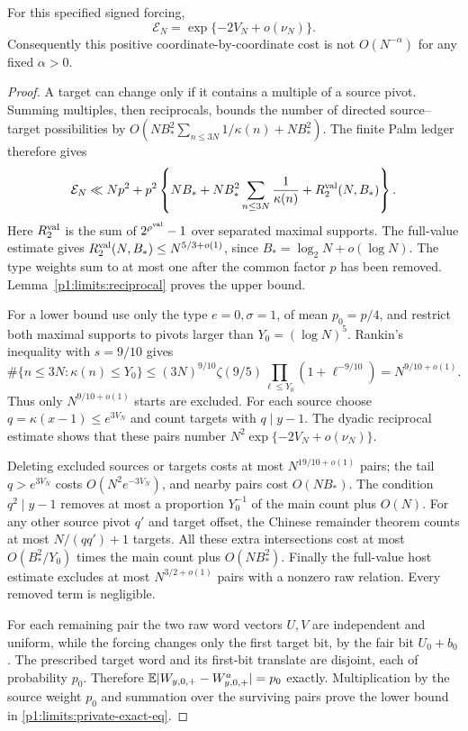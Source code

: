 \begin{proposition}
\label{p1:limits:private-exact}
For this specified signed forcing,
\begin{equation}
 \mathcal E_N=\exp\{-2V_N+o(\nu_N)\}.
 \label{p1:limits:private-exact-eq}
\end{equation}
Consequently this positive coordinate-by-coordinate cost is
not $O(N^{-\alpha})$ for any fixed $\alpha>0$.
\end{proposition}
\begin{proof}
A target can change only if it contains a multiple of a
source pivot.  Summing multiples, then reciprocals, bounds
the number of directed source--target possibilities by
$O(NB_*^2\sum_{n\le3N}1/\kappa(n)+NB_*^2)$.
The finite Palm ledger
\cite[Lemma~F.2 and equation~(F.6)]{pouly2026c} therefore gives
\[
 \mathcal E_N\ll Np^2+
 p^2\left\{NB_*+
       NB_*^2\sum_{n\le3N}\frac1{\kappa(n)}
       +R^{\rm val}_2(N,B_*)\right\}.
\]
Here $R^{\rm val}_2$ is the sum of $2^{\rho^{\rm val}}-1$
over separated maximal supports.  The full-value estimate
\cite[Proposition~3.24]{pouly2026c} gives
$R^{\rm val}_2(N,B_*)\le N^{5/3+o(1)}$, since
$B_*=\log_2N+o(\log N)$.  The type weights sum to at most
one after the common factor $p$ has been removed.
Lemma~\ref{p1:limits:reciprocal} proves the upper bound.

For a lower bound use only the type $e=0,\sigma=1$, of
mean $p_0=p/4$, and restrict both maximal supports to pivots
larger than $Y_0=(\log N)^5$.  Rankin's inequality with
$s=9/10$ gives
\[
 \#\{n\le3N:\kappa(n)\le Y_0\}
 \le(3N)^{9/10}\zeta(9/5)
                    \prod_{\ell\le Y_0}(1+\ell^{-9/10})
       =N^{9/10+o(1)}.
\]
Thus only $N^{9/10+o(1)}$ starts are excluded.
For each source choose $q=\kappa(x-1)\le e^{3V_N}$
and count targets with $q\mid y-1$.
The dyadic reciprocal estimate shows that these pairs number
$N^2\exp\{-2V_N+o(\nu_N)\}$.

Deleting excluded sources or targets costs at most
$N^{19/10+o(1)}$ pairs; the tail $q>e^{3V_N}$ costs
$O(N^2e^{-3V_N})$, and nearby pairs cost $O(NB_*)$.
The condition $q^2\mid y-1$ removes at most a proportion
$Y_0^{-1}$ of the main count plus $O(N)$.
For any other source pivot $q'$ and target offset, the
Chinese remainder theorem counts at most $N/(qq')+1$
targets.  All these extra intersections cost at most
$O(B_*^2/Y_0)$ times the main count plus $O(NB_*^2)$.
Finally the full-value host estimate
\cite[Proposition~3.7]{pouly2026c} excludes at most
$N^{3/2+o(1)}$ pairs with a nonzero raw relation.
Every removed term is negligible.

For each remaining pair the two raw word vectors $U,V$
are independent and uniform, while the forcing changes
only the first target bit, by the fair bit $U_0+b_0$.
The prescribed target word and its first-bit translate
are disjoint, each of probability $p_0$.  Therefore
$\mathbb E|W_{y,0,+}-W^a_{y,0,+}|=p_0$ exactly.
Multiplication by the source weight $p_0$ and summation
over the surviving pairs prove the lower bound in
\eqref{p1:limits:private-exact-eq}.
\end{proof}

